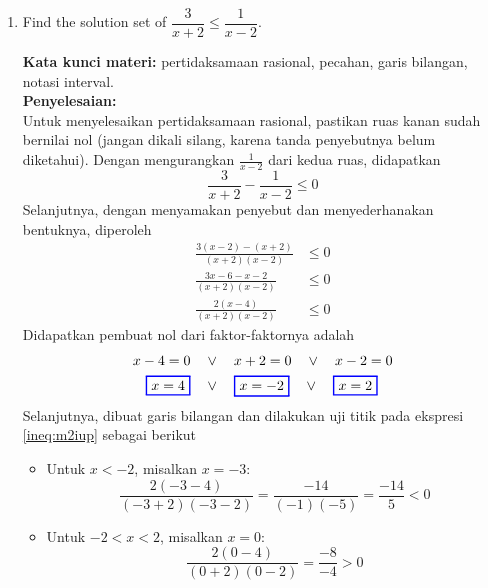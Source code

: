 \documentclass[10pt,openany,a4paper]{article}
\theoremstyle{definition}
\theoremstyle{definition}
\theoremstyle{plain}
\newenvironment{jawab}[2][tes]{%
\par\noindent\textbf{Kata kunci materi:} #1.\\
\textbf{Penyelesaian:} #2%
}{}
\begin{document}
\newpage

\begin{enumerate}
    \item Find the solution set of $\dfrac{3}{x+2}\leq\dfrac{1}{x-2}$.
    \begin{jawab}[pertidaksamaan rasional, pecahan, garis bilangan, notasi interval]{~\\
        Untuk menyelesaikan pertidaksamaan rasional, pastikan ruas kanan sudah bernilai nol (jangan dikali silang, karena tanda penyebutnya belum diketahui). Dengan mengurangkan \(\frac{1}{x-2}\) dari kedua ruas, didapatkan
        \[
        \frac{3}{x+2} - \frac{1}{x-2} \leq 0
        \]
        Selanjutnya, dengan menyamakan penyebut dan menyederhanakan bentuknya, diperoleh
        \begin{align}
            \frac{3(x-2)-(x+2)}{(x+2)(x-2)} &\leq 0\nonumber\\
            \frac{3x-6-x-2}{(x+2)(x-2)} &\leq 0\nonumber \\
            \frac{2(x-4)}{(x+2)(x-2)} &\leq 0 \label{ineq:m2iup}
        \end{align}
        Didapatkan pembuat nol dari faktor-faktornya adalah
        \begin{align*}
            x-4 = 0 \quad &\vee\quad  x+2 = 0 \quad\vee\quad x-2=0\\
            \colorlet{oldcolor}{.}
        \color{blue}
        \setlength{\fboxrule}{1pt} \boxed{\color{oldcolor}x=4}\color{oldcolor} \quad &\vee\quad \colorlet{oldcolor}{.}
        \color{blue}
        \setlength{\fboxrule}{1pt} \boxed{\color{oldcolor}x=-2}\color{oldcolor} \quad\vee\quad \colorlet{oldcolor}{.}
        \color{blue}
        \setlength{\fboxrule}{1pt} \boxed{\color{oldcolor}x=2}\color{oldcolor}
        \end{align*}
        Selanjutnya, dibuat garis bilangan dan dilakukan uji titik pada ekspresi \eqref{ineq:m2iup} sebagai berikut
        \begin{itemize}
            \item Untuk \(x < -2\), misalkan \(x = -3\):
            \[
            \frac{2(-3-4)}{(-3+2)(-3-2)} = \frac{-14}{(-1)(-5)} = \frac{-14}{5} < 0
            \]
            \item Untuk \(-2 < x < 2\), misalkan \(x = 0\):
            \[
            \frac{2(0-4)}{(0+2)(0-2)} = \frac{-8}{-4} > 0
\]
\end{itemize}}
\end{jawab}
\end{enumerate}
\end{document}
